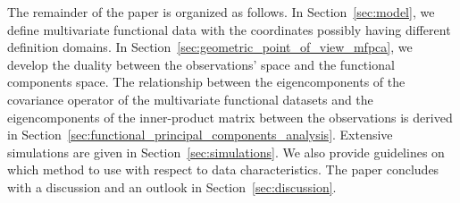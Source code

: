 The remainder of the paper is organized as follows. In Section~\ref{sec:model}, we define multivariate functional data with the coordinates possibly having different definition domains. In Section~\ref{sec:geometric_point_of_view_mfpca}, we develop the duality between the observations' space and the functional components space. The relationship between the eigencomponents of the covariance operator of the multivariate functional datasets and the eigencomponents of the inner-product matrix between the observations is derived in Section~\ref{sec:functional_principal_components_analysis}. Extensive simulations are given in Section~\ref{sec:simulations}. We also provide guidelines on which method to use with respect to data characteristics. The paper concludes with a discussion and an outlook in Section~\ref{sec:discussion}.

